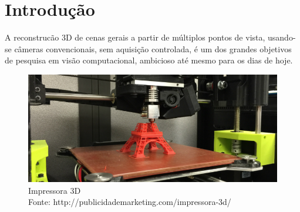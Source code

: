 \documentclass[table, usenames, svgnames, xcolor=dvipsnames]{beamer}
\begin{document}

\begin{frame}

	\footnotesize{ \tableofcontents[hideallsubsections] }
\end{frame}


\section{Introdução}
\begin{frame} 
	\begin{center}
		A reconstrucão 3D de cenas gerais a partir de múltiplos pontos de vista, usando-se câmeras convencionais, sem aquisição controlada, é um dos grandes objetivos de pesquisa em visão computacional, ambicioso até mesmo para os dias de hoje.
	\end{center}
\end{frame}

\begin{frame} 
	\begin{figure}[!h]
		\centering
		\includegraphics[width=1\linewidth]{figs/impressora-3d-capa.jpg}
		\caption{%
		Impressora 3D \\
		\tiny{Fonte: http://publicidademarketing.com/impressora-3d/}		
		}
	\end{figure}
\end{frame}
\end{document}
